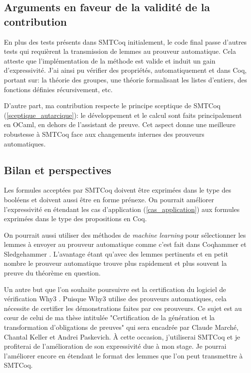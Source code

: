 \documentclass[11pt]{article}
\begin{document}
\subsection{Arguments en faveur de la validité de la contribution}

En plus des tests présents dans SMTCoq initialement, le code final passe d'autres tests qui requièrent la transmission de lemmes au prouveur automatique. Cela atteste  que l'implémentation de la méthode est valide et induit un gain d'expressivité. J'ai ainsi pu vérifier des propriétés, automatiquement et dans Coq, portant sur: la théorie des groupes, une théorie formalisant les listes d'entiers, des fonctions définies récursivement, etc.

D'autre part, ma contribution respecte le principe sceptique de SMTCoq (\ref{sceptique_autarcique}): le développement et le calcul sont faits principalement en OCaml, en dehors de l'assistant de preuve. Cet aspect donne une meilleure robustesse à SMTCoq face aux changements internes des prouveurs automatiques.


\subsection{Bilan et perspectives}\label{persp}

Les formules acceptées par SMTCoq doivent être exprimées dans le type des booléens et doivent aussi être en forme prénexe. On pourrait améliorer l'expressivité en étendant les cas d'application (\ref{cas_application}) aux formules exprimées dans le type des propositions en Coq.

On pourrait aussi utiliser des méthodes de \textit{machine learning} pour sélectionner les lemmes à envoyer au prouveur automatique comme c'est fait dans Coqhammer et Sledgehammer \cite{hol_selector, coqhammer}. L'avantage étant qu'avec des lemmes pertinents et en petit nombre le prouveur automatique trouve plus rapidement et plus souvent la preuve du théorème en question.

Un autre but que l'on souhaite poursuivre est la certification du logiciel de vérification Why3 \cite{why3_intro}. Puisque Why3 utilise des prouveurs automatiques, cela nécessite de certifier les démonstrations faites par ces prouveurs. Ce sujet est au c\oe ur de celui de ma thèse intitulée "Certification de la génération et la transformation d'obligations de preuves" qui sera encadrée par Claude Marché, Chantal Keller et Andrei Paskevich. À cette occasion, j'utiliserai SMTCoq et je profiterai de l'amélioration de son expressivité due à mon stage. Je pourrai l'améliorer encore en étendant le format des lemmes que l'on peut transmettre à SMTCoq. \medbreak
\end{document}
